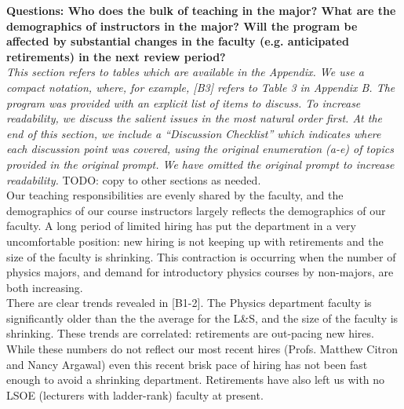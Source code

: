 \documentclass[12pt]{article}
\begin{document}
{\bf Questions: Who does the bulk of teaching in the major? What are the demographics of instructors in the major? Will the program be affected by substantial changes in the faculty (e.g. anticipated retirements) in the next review period?}\\[3pt]


\noindent
{\it This section refers to tables which are available in the Appendix.  We
use a compact notation, where, for example, [B3] refers to Table 3 in
Appendix B.  The program was provided with an explicit list of items
to discuss.  To increase readability, we discuss the salient issues in
the most natural order first.  At the end of this section, we include a
``Discussion Checklist'' which indicates where each discussion point
was covered, using the original enumeration (a-e) of topics provided
in the original prompt. We have omitted the original prompt to
increase readability.}  {\color{red} TODO: copy to other sections as
      needed}.\\[3pt]

\noindent
Our teaching responsibilities are evenly shared by the faculty, and
the demographics of our course instructors largely reflects the
demographics of our faculty.  A long period of limited hiring has put
the department in a very uncomfortable position: new hiring is not
keeping up with retirements and the size of the faculty is shrinking.
This contraction is occurring when the number of physics majors, and
demand for introductory physics courses by non-majors, are both
increasing.\\[3pt]

 There are clear trends
revealed in [B1-2].  The Physics department faculty is significantly
older than the the average for the L\&S, and the size of the faculty
is shrinking.  These trends are correlated: retirements are out-pacing
new hires.  While these numbers do not reflect our most recent hires
(Profs. Matthew Citron and Nancy Argawal) even this recent brisk pace
of hiring has not been fast enough to avoid a shrinking department.
Retirements have also left us with no LSOE (lecturers with
ladder-rank) faculty at present.
\end{document}

